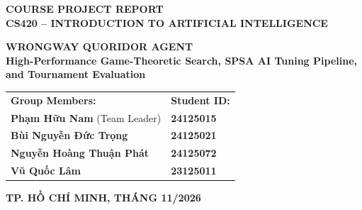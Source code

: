 \documentclass[a4paper,12pt]{article}
\begin{document}
\begin{titlepage}
\begin{center}
        {\fontsize{13pt}{16pt}\selectfont \textbf{COURSE PROJECT REPORT}}\\[5pt]
        {\fontsize{12pt}{15pt}\selectfont \textbf{CS420 -- INTRODUCTION TO ARTIFICIAL INTELLIGENCE}}\\[0.8cm]
        
        \begin{tcolorbox}[
            colback=white,
            colframe=black,
            arc=0mm,
            boxrule=1.5pt,
            width=0.92\textwidth,
            halign=center
        ]
            \vspace{0.25cm}
            {\fontsize{17pt}{22pt}\selectfont \textbf{WRONGWAY QUORIDOR AGENT}}\\[8pt]
            {\fontsize{11.5pt}{16pt}\selectfont \textbf{High-Performance Game-Theoretic Search, SPSA AI Tuning Pipeline, and Tournament Evaluation}}
            \vspace{0.25cm}
        \end{tcolorbox}
        
        \vfill
        
        \begin{minipage}{0.84\textwidth}
            \renewcommand{\arraystretch}{1.35}
            \begin{tabular}{@{}ll@{}}
                \textbf{Group Members:} & \textbf{Student ID:} \\
                \quad \textbf{Phạm Hữu Nam} (Team Leader) & \quad \textbf{24125015} \\
                \quad \textbf{Bùi Nguyễn Đức Trọng} & \quad \textbf{24125021} \\
                \quad \textbf{Nguyễn Hoàng Thuận Phát} & \quad \textbf{24125072} \\
                \quad \textbf{Vũ Quốc Lâm} & \quad \textbf{23125011} \\
            \end{tabular}
        \end{minipage}
        
        \vfill
        \vspace*{0.3cm}
        {\fontsize{11pt}{14pt}\selectfont \textbf{TP. HỒ CHÍ MINH, THÁNG 11/2026}}\\[0.1cm]
    \end{center}
\end{titlepage}

\newpage
    
    \renewcommand{\baselinestretch}{1.05}\normalsize
    \tableofcontents
    \renewcommand{\baselinestretch}{1.15}\normalsize

	\newpage











%

\label{EndOfText}
\end{document}
